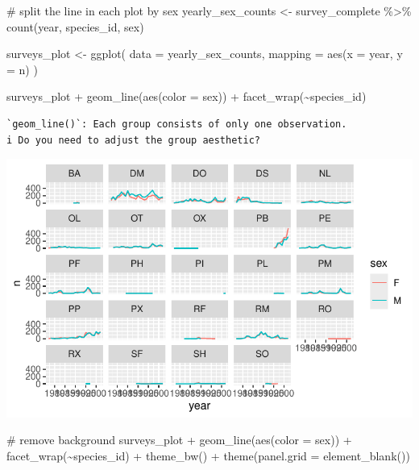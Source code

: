 \documentclass[
  letterpaper,
  DIV=11,
  numbers=noendperiod]{scrreprt}
\newenvironment{Shaded}{\begin{snugshade}}{\end{snugshade}}
\newcommand{\AttributeTok}[1]{\textcolor[rgb]{0.40,0.45,0.13}{#1}}
\newcommand{\CommentTok}[1]{\textcolor[rgb]{0.37,0.37,0.37}{#1}}
\newcommand{\FunctionTok}[1]{\textcolor[rgb]{0.28,0.35,0.67}{#1}}
\newcommand{\NormalTok}[1]{\textcolor[rgb]{0.00,0.23,0.31}{#1}}
\newcommand{\OtherTok}[1]{\textcolor[rgb]{0.00,0.23,0.31}{#1}}
\newcommand{\SpecialCharTok}[1]{\textcolor[rgb]{0.37,0.37,0.37}{#1}}
\begin{document}
\begin{Shaded}
\begin{Highlighting}[]
\CommentTok{\# split the line in each plot by sex}
\NormalTok{yearly\_sex\_counts }\OtherTok{\textless{}{-}}\NormalTok{ survey\_complete }\SpecialCharTok{\%\textgreater{}\%}
  \FunctionTok{count}\NormalTok{(year, species\_id, sex)}

\NormalTok{surveys\_plot }\OtherTok{\textless{}{-}} \FunctionTok{ggplot}\NormalTok{(}
  \AttributeTok{data =}\NormalTok{ yearly\_sex\_counts,}
  \AttributeTok{mapping =} \FunctionTok{aes}\NormalTok{(}\AttributeTok{x =}\NormalTok{ year, }\AttributeTok{y =}\NormalTok{ n)}
\NormalTok{)}

\NormalTok{surveys\_plot }\SpecialCharTok{+} \FunctionTok{geom\_line}\NormalTok{(}\FunctionTok{aes}\NormalTok{(}\AttributeTok{color =}\NormalTok{ sex)) }\SpecialCharTok{+}
  \FunctionTok{facet\_wrap}\NormalTok{(}\SpecialCharTok{\textasciitilde{}}\NormalTok{species\_id)}
\end{Highlighting}
\end{Shaded}

\begin{verbatim}
`geom_line()`: Each group consists of only one observation.
i Do you need to adjust the group aesthetic?
\end{verbatim}

\includegraphics{src/notebooks/r_files/figure-pdf/unnamed-chunk-51-5.pdf}

\begin{Shaded}
\begin{Highlighting}[]
\CommentTok{\# remove background}
\NormalTok{surveys\_plot }\SpecialCharTok{+} \FunctionTok{geom\_line}\NormalTok{(}\FunctionTok{aes}\NormalTok{(}\AttributeTok{color =}\NormalTok{ sex)) }\SpecialCharTok{+}
  \FunctionTok{facet\_wrap}\NormalTok{(}\SpecialCharTok{\textasciitilde{}}\NormalTok{species\_id) }\SpecialCharTok{+}
  \FunctionTok{theme\_bw}\NormalTok{() }\SpecialCharTok{+}
  \FunctionTok{theme}\NormalTok{(}\AttributeTok{panel.grid =} \FunctionTok{element\_blank}\NormalTok{())}
\end{Highlighting}
\end{Shaded}
\end{document}
